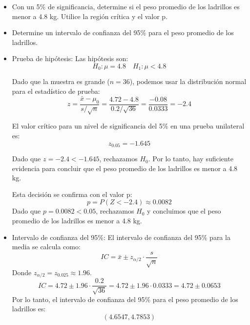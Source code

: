 \documentclass{article}
\begin{document}
\begin{itemize}
  \item Con un 5\% de significancia, determine si el peso promedio de los ladrillos es menor a 4.8 kg. Utilice la región crítica y el valor p.
  \item Determine un intervalo de confianza del 95\% para el peso promedio de los ladrillos.
\end{itemize}

\begin{itemize}
  \item Prueba de hipótesis:
  Las hipótesis son:
  \[
  H_0: \mu = 4.8 \quad \text{} H_1: \mu < 4.8
  \]

  Dado que la muestra es grande (\( n = 36 \)), podemos usar la distribución normal para el estadístico de prueba:
  \[
  z = \frac{\bar{x} - \mu_0}{s/\sqrt{n}} = \frac{4.72 - 4.8}{0.2/\sqrt{36}} = \frac{-0.08}{0.0333} = -2.4
  \]

  El valor crítico para un nivel de significancia del 5\% en una prueba unilateral es:
  \[
  z_{0.05} = -1.645
  \]

  Dado que \( z = -2.4 < -1.645 \), rechazamos \( H_0 \). Por lo tanto, hay suficiente evidencia para concluir que el peso promedio de los ladrillos es menor a 4.8 kg.

  Esta decisión se confirma con el valor p:
  \[
  p = P(Z < -2.4) \approx 0.0082
  \]
  Dado que \( p = 0.0082 < 0.05 \), rechazamos \( H_0 \) y concluimos que el peso promedio de los ladrillos es menor a 4.8 kg.

  \item Intervalo de confianza del 95\%:
  El intervalo de confianza del 95\% para la media se calcula como:
  \[
  IC = \bar{x} \pm z_{\alpha/2} \cdot \frac{s}{\sqrt{n}}
  \]
  Donde \( z_{\alpha/2} = z_{0.025} \approx 1.96 \).
  \[
  IC = 4.72 \pm 1.96 \cdot \frac{0.2}{\sqrt{36}} = 4.72 \pm 1.96 \cdot 0.0333 = 4.72 \pm 0.0653
  \]
  Por lo tanto, el intervalo de confianza del 95\% para el peso promedio de los ladrillos es:
  \[
  (4.6547, 4.7853)
  \]
  
\end{itemize}
\end{document}
